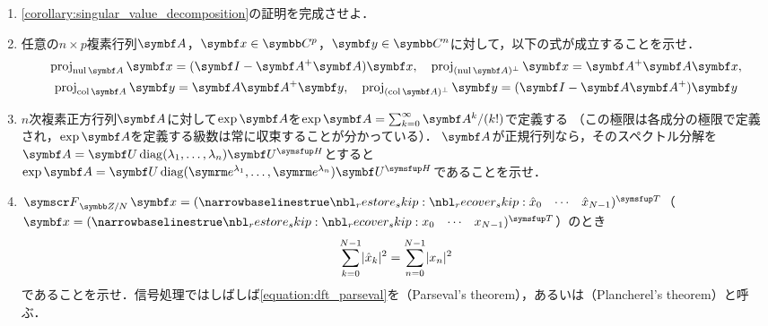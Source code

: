 \documentclass[../../main]{subfiles}
\begin{document}
\begin{enumerate}
  \item \cref{corollary:singular_value_decomposition}の証明を完成させよ．
  \item 任意の\(n\times p\)複素行列\(\mat{A}\)，\(\vect{x}\in\numset{C}^p\)，\(\vect{y}\in\numset{C}^n\)に対して，以下の式が成立することを示せ．
    \begin{gather*}
      \proj_{\nulsp\mat{A}}\vect{x} = (\imat-\pinv{\mat{A}}\mat{A})\vect{x},
      \quad\proj_{\pcomp{(\nulsp\mat{A})}}\vect{x} = \pinv{\mat{A}}\mat{A}\vect{x}, \\
      \proj_{\colsp\mat{A}}\vect{y} = \mat{A}\pinv{\mat{A}}\vect{y},
      \quad\proj_{\pcomp{(\colsp\mat{A})}}\vect{y} = (\imat-\mat{A}\pinv{\mat{A}})\vect{y}
    \end{gather*}
  \item \(n\)次複素正方行列\(\mat{A}\)に対して\(\exp\mat{A}\)を\(\exp\mat{A}=\sum_{k=0}^\infty\mat{A}^k/(k!)\)で定義する
    （この極限は各成分の極限で定義され，\(\exp\mat{A}\)を定義する級数は常に収束することが分かっている）．
    \(\mat{A}\)が正規行列なら，そのスペクトル分解を\(\mat{A}=\mat{U}\diag(\lambda_1,\dots,\lambda_n)\htrps{\mat{U}}\)とすると
    \(\exp\mat{A}=\mat{U}\diag(\napr^{\lambda_1},\dots,\napr^{\lambda_n})\htrps{\mat{U}}\)であることを示せ．
  \item \(\dft{N}\vect{x}=\trps{\rowvect{\hat{x}_0 & \cdots & \hat{x}_{N-1}}}\)（\(\vect{x}=\trps{\rowvect{x_0 & \cdots & x_{N-1}}}\)）のとき
  \begin{equation}
    \label{equation:dft_parseval}
    \sum_{k=0}^{N-1}\lvert\hat{x}_k\rvert^2 = \sum_{n=0}^{N-1}\lvert x_n\rvert^2
  \end{equation}
  であることを示せ．信号処理ではしばしば\cref{equation:dft_parseval}を（Parseval's theorem），あるいは（Plancherel's theorem）と呼ぶ．  
\end{enumerate}
\end{document}
